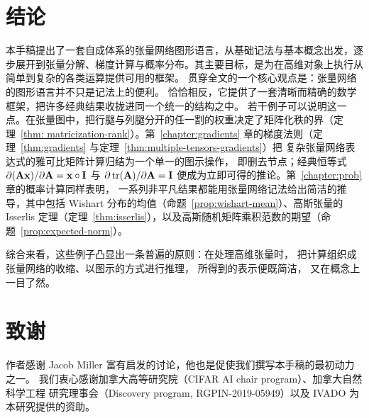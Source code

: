\section{结论}\label{chapter:conclusion}

本手稿提出了一套自成体系的张量网络图形语言，从基础记法与基本概念出发，逐步展开到张量分解、梯度计算与概率分布。其主要目标，是为在高维对象上执行从简单到复杂的各类运算提供可用的框架。
贯穿全文的一个核心观点是：张量网络的图形语言并不只是记法上的便利。
恰恰相反，它提供了一套清晰而精确的数学框架，把许多经典结果收拢进同一个统一的结构之中。
若干例子可以说明这一点。在张量图中，把行腿与列腿分开的任一割的权重决定了矩阵化秩的界（定理~\ref{thm: matricization-rank}）。第~\ref{chapter:gradients} 章的梯度法则（定理~\ref{thm:gradients} 与定理~\ref{thm:multiple-tensors-gradients}）把
复杂张量网络表达式的雅可比矩阵计算归结为一个单一的图示操作，
即删去节点；经典恒等式
$\partial(\mathbf{A}\mathbf{x})/\partial \mathbf{A} = \mathbf{x} \circ \mathbf{I}$ 与 $\partial \mathop{\mathrm{tr}}(\mathbf{A})/\partial \mathbf{A} = \mathbf{I}$
便成为立即可得的推论。第~\ref{chapter:prob} 章的概率计算同样表明，
一系列非平凡结果都能用张量网络记法给出简洁的推导，其中包括 Wishart 分布的均值（命题~\ref{prop:wishart-mean}）、高斯张量的 Isserlis 定理（定理~\ref{thm:isserlis}），以及高斯随机矩阵乘积范数的期望（命题~\ref{prop:expected-norm}）。

综合来看，这些例子凸显出一条普遍的原则：在处理高维张量时，
把计算组织成张量网络的收缩、以图示的方式进行推理，
所得到的表示便既简洁，
又在概念上一目了然。

















\section*{致谢}
作者感谢 Jacob Miller 富有启发的讨论，他也是促使我们撰写本手稿的最初动力之一。
我们衷心感谢加拿大高等研究院（CIFAR AI chair program）、加拿大自然科学工程
研究理事会（Discovery program, RGPIN-2019-05949）以及 IVADO 为本研究提供的资助。
